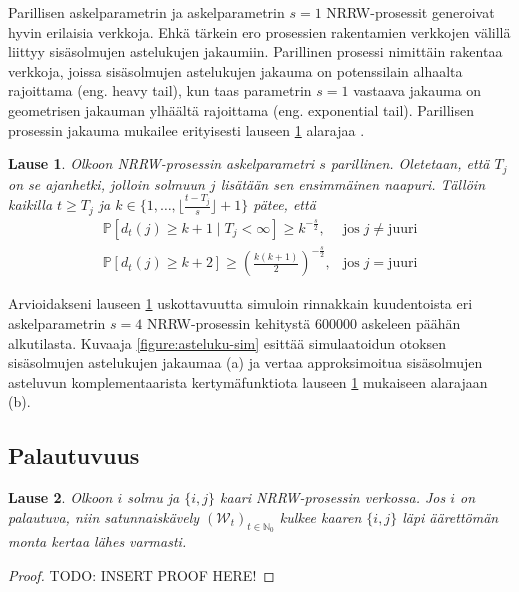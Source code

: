 \documentclass[finnish, 12pt, a4paper, sci, utf8, pdfa]{aaltothesis}
\newcommand{\N}{\mathbb{N}}
\newcommand{\Wrandom}{\mathcal{W}}
\newcommand*{\prob}{\mathbb{P}}
\newtheorem{theorem}{Lause}
\begin{document}
Parillisen askelparametrin ja askelparametrin $ s = 1 $ NRRW-prosessit generoivat hyvin erilaisia verkkoja. Ehkä tärkein ero prosessien rakentamien verkkojen välillä liittyy sisäsolmujen
astelukujen jakaumiin. Parillinen prosessi nimittäin rakentaa verkkoja, joissa sisäsolmujen astelukujen jakauma on potenssilain alhaalta rajoittama (eng. heavy tail), kun taas parametrin $ s = 1 $ vastaava jakauma on geometrisen jakauman ylhäältä rajoittama (eng. exponential tail). Parillisen prosessin jakauma mukailee erityisesti lauseen \ref{theorem:asteluku} alarajaa \cite{Iacobelli}.

\begin{theorem}
   Olkoon NRRW-prosessin askelparametri $ s $ parillinen. Oletetaan, että $ T_{j} $ on se ajanhetki, jolloin solmuun $ j $ lisätään sen ensimmäinen naapuri. Tällöin kaikilla $ t \geq T_{j} $ ja $ k \in \{1,\ldots,\lfloor \frac{t-T_{j}}{s} \rfloor + 1\} $ pätee, että
   \[
      \renewcommand{\arraystretch}{2.0}
      \begin{array}{lr}
         \prob \left[ d_{t}(j) \geq k + 1 \mid T_{j} < \infty \right] \geq k^{-\frac{s}{2}},             & \text{jos} \; j \neq \text{juuri} \\
         \prob \left[ d_{t}(j) \geq k + 2 \right] \geq \left( \frac{k(k+1)}{2} \right)^{-\frac{s}{2}},   & \text{jos} \; j = \text{juuri}
      \end{array}
   \]
   \label{theorem:asteluku}
\end{theorem}
Arvioidakseni lauseen \ref{theorem:asteluku} uskottavuutta simuloin rinnakkain kuudentoista eri askelparametrin $ s = 4 $ NRRW-prosessin kehitystä 600000 askeleen päähän alkutilasta. 
Kuvaaja \ref{figure:asteluku-sim} esittää simulaatoidun otoksen sisäsolmujen astelukujen jakaumaa (a) ja vertaa approksimoitua sisäsolmujen asteluvun komplementaarista kertymäfunktiota
lauseen \ref{theorem:asteluku} mukaiseen alarajaan (b).

\subsection{Palautuvuus}

\begin{theorem}
Olkoon $ i $ solmu ja $ \{i, j\} $ kaari NRRW-prosessin verkossa. Jos $ i $ on palautuva, niin satunnaiskävely $ (\Wrandom_{t})_{t \in \N_{0}} $ kulkee kaaren $ \{i, j\} $ läpi äärettömän monta kertaa lähes varmasti.
\end{theorem}

\begin{proof}
TODO: INSERT PROOF HERE!
\end{proof}
\end{document}
